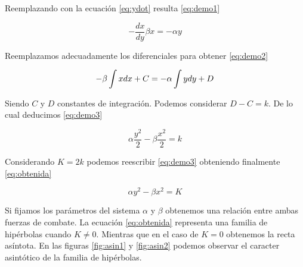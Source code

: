 \documentclass{sig-alternate}
\begin{document}
Reemplazando con la ecuación \eqref{eq:ydot} resulta \eqref{eq:demo1}

\begin{equation}
-\frac{dx}{dy}\beta x=-\alpha y
\label{eq:demo1}
\end{equation}

Reemplazamos adecuadamente los diferenciales para obtener \eqref{eq:demo2}

\begin{equation}
-\beta\intop x dx + C =-\alpha\int y dy + D
\label{eq:demo2}
\end{equation}

Siendo $C$ y $D$ constantes de integración. Podemos considerar $D - C = k$. De lo cual deducimos \eqref{eq:demo3}

\begin{equation}
\alpha\frac{y^{2}}{2}-\beta\frac{x^{2}}{2}=k
\label{eq:demo3}
\end{equation}


Considerando $K=2k$ podemos reescribir \eqref{eq:demo3} obteniendo finalmente \eqref{eq:obtenida}

\begin{equation}
\alpha y^{2}-\beta x^{2}=K
\label{eq:obtenida}
\end{equation}

Si fijamos los parámetros del sistema $\alpha$ y $\beta$ obtenemos una relación entre ambas fuerzas de combate. 
La ecuación \eqref{eq:obtenida} representa una familia de hip\'erbolas cuando $K \ne 0$. 
Mientras que en el caso de $K = 0$ obtenemos la recta asíntota. En las figuras \ref{fig:asin1} y \ref{fig:asin2} podemos observar el caracter asintótico de la familia de hipérbolas.
\end{document}
